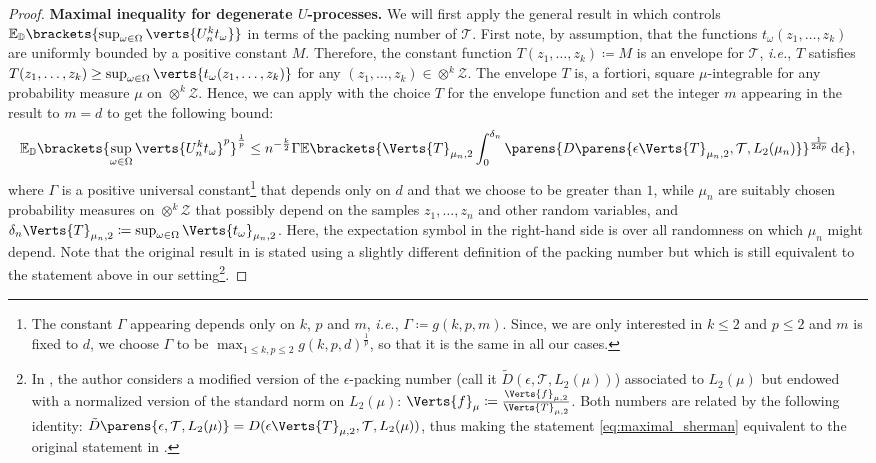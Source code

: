\begin{proof}
	{\bf Maximal inequality for degenerate $U$-processes.}
We  will first apply the general result in \citep[Maximal inequality]{sherman1994maximal} which controls $\mathbb{E}_{\PP}\brackets{\sup_{\omega\in \Omega} \verts{U_n^k t_{\omega}}}$ in terms of the packing number of $\mathcal{T}$.
First note, by assumption, that the functions $t_{\omega}(z_1,\ldots,z_k)$  are  uniformly bounded by a positive constant $M$. Therefore, the constant function $T(z_1,\ldots,z_k) \coloneqq M$ is an envelope for $\mathcal{T}$, \textit{i.e.}, $T$ satisfies $T(z_1,\ldots,z_k)\geq \sup_{\omega\in \Omega} \verts{t_{\omega}(z_1,\ldots,z_k)}$ for any $(z_1,\ldots,z_k)\in\otimes^k \mathcal{Z}$. 
The envelope $T$ is, a fortiori,  square $\mu$-integrable for any probability measure $\mu$ on $\otimes^k \mathcal{Z}$. Hence, we can apply \citep[Maximal inequality]{sherman1994maximal} with the choice $T$ for the envelope function and set the integer $m$ appearing in the result to $m=d$ to get the following bound:
\begin{align}\label{eq:maximal_sherman}
	\mathbb{E}_{\PP}\brackets{\sup_{\omega\in \Omega} \verts{U^k_n t_{\omega}}^p}^{\frac{1}{p}}\leq n^{-\frac{k}{2}} \Gamma 
	\mathbb{E}\brackets{\Verts{T}_{\mu_n,2} \int_{0}^{\delta_n} \parens{D\parens{\epsilon \Verts{T}_{\mu_n,2},\mathcal{T},L_2(\mu_n) }}^{\frac{1}{2dp}}\diff \epsilon  }, 
\end{align}
where $\Gamma$ is a positive universal constant\footnote{The constant $\Gamma$ appearing \citep[Maximal inequality]{sherman1994maximal} depends only on $k$, $p$ and $m$, \textit{i.e.}, $\Gamma\coloneqq g(k,p,m)$. Since, we are only interested in $k\leq 2$ and $p\leq 2$ and $m$ is fixed to $d$, we choose $\Gamma$ to be $\max_{1\leq k,p\leq 2}g(k,p,d)^{\frac{1}{p}}$, so that it is the same in all our cases.} that depends only on $d$ and that we choose to be greater than $1$,  while $\mu_{n}$ are suitably chosen  probability measures on $\otimes^k\mathcal{Z}$ that possibly depend on the samples $z_1,\ldots,z_n$ and other random variables, and $\delta_n \Verts{T}_{\mu_n,2} \coloneqq \sup_{\omega\in \Omega} \Verts{t_{\omega}}_{\mu_n,2}$. Here, the expectation symbol in the right-hand side is over all randomness on which $\mu_n$ might depend. Note that the original result in \citep[Maximal inequality]{sherman1994maximal} is stated using a slightly different definition of the packing number but which is still equivalent to the statement above in our setting\footnote{In \citep[Maximal inequality]{sherman1994maximal}, the author considers a modified version of the $\epsilon$-packing number (call it $\tilde{D}(\epsilon, \mathcal{T},L_{2}(\mu))$) associated to $L_2(\mu)$ but endowed with a normalized version of the standard norm on  $L_2(\mu)$: $\Verts{f}_{\mu}\coloneqq\frac{\Verts{f}_{\mu,2}}{\Verts{T}_{\mu,2}}$.  Both numbers are related by the following identity:  $\tilde{D}\parens{\epsilon, \mathcal{T},L_{2}(\mu)} = D(\epsilon{\Verts{T}_{\mu,2}}, \mathcal{T},L_{2}(\mu))$, thus making the statement \eqref{eq:maximal_sherman} equivalent to the original statement in \citep[Maximal inequality]{sherman1994maximal}.
}. 



\end{proof}
